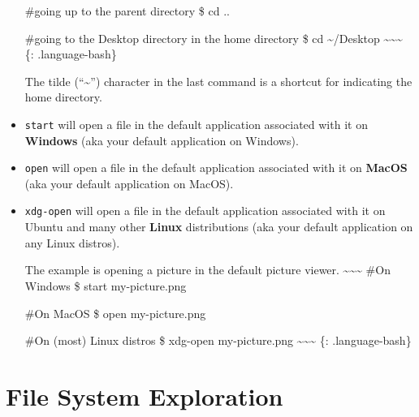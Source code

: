 \documentclass[
]{book}
\begin{document}
\begin{itemize}
  \#going up to the parent directory
  \$ cd ..

  \#going to the Desktop directory in the home directory
  \$ cd \textasciitilde/Desktop
  \textasciitilde\textasciitilde\textasciitilde{}
  \{: .language-bash\}

  The tilde (``\textasciitilde{}'') character in the last command is a shortcut for indicating the home directory.
\item
  \texttt{start} will open a file in the default application associated with it on \textbf{Windows} (aka your default application on Windows).
\item
  \texttt{open} will open a file in the default application associated with it on \textbf{MacOS} (aka your default application on MacOS).
\item
  \texttt{xdg-open} will open a file in the default application associated with it on Ubuntu and many other \textbf{Linux} distributions (aka your default application on any Linux distros).

  The example is opening a picture in the default picture viewer.
  \textasciitilde\textasciitilde\textasciitilde{}
  \#On Windows
  \$ start my-picture.png

  \#On MacOS
  \$ open my-picture.png

  \#On (most) Linux distros
  \$ xdg-open my-picture.png
  \textasciitilde\textasciitilde\textasciitilde{}
  \{: .language-bash\}
\end{itemize}

\hypertarget{file-system-exploration}{%
\section{File System Exploration}\label{file-system-exploration}}
\end{document}

